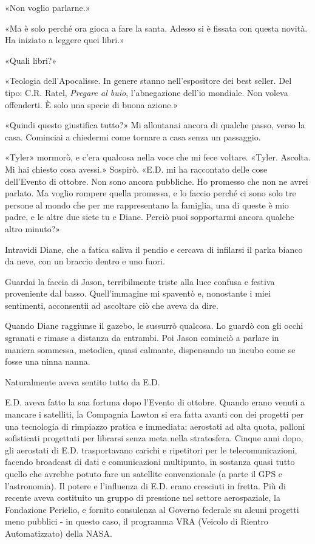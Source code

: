 «Non voglio parlarne.»

«Ma è solo perché ora gioca a fare la santa. Adesso si è fissata con
questa novità. Ha iniziato a leggere quei libri.»

«Quali libri?»

«Teologia dell'Apocalisse. In genere stanno nell'espositore dei best
seller. Del tipo: C.R. Ratel, \emph{Pregare al buio}, l'abnegazione
dell'io mondiale. Non voleva offenderti. È solo una specie di buona
azione.»

«Quindi questo giustifica tutto?» Mi allontanai ancora di qualche passo,
verso la casa. Cominciai a chiedermi come tornare a casa senza un
passaggio.

«Tyler» mormorò, e c'era qualcosa nella voce che mi fece voltare.
«Tyler. Ascolta. Mi hai chiesto cosa avessi.» Sospirò. «E.D. mi ha
raccontato delle cose dell'Evento di ottobre. Non sono ancora pubbliche.
Ho promesso che non ne avrei parlato. Ma voglio rompere quella promessa,
e lo faccio perché ci sono solo tre persone al mondo che per me
rappresentano la famiglia, una di queste è mio padre, e le altre due
siete tu e Diane. Perciò puoi sopportarmi ancora qualche altro minuto?»

Intravidi Diane, che a fatica saliva il pendio e cercava di infilarsi il
parka bianco da neve, con un braccio dentro e uno fuori.

Guardai la faccia di Jason, terribilmente triste alla luce confusa e
festiva proveniente dal basso. Quell'immagine mi spaventò e, nonostante
i miei sentimenti, acconsentii ad ascoltare ciò che aveva da dire.

\separatorefiori

Quando Diane raggiunse il gazebo, le sussurrò qualcosa. Lo guardò con
gli occhi sgranati e rimase a distanza da entrambi. Poi Jason cominciò a
parlare in maniera sommessa, metodica, quasi calmante, dispensando un
incubo come se fosse una ninna nanna.

Naturalmente aveva sentito tutto da E.D.

E.D. aveva fatto la sua fortuna dopo l'Evento di ottobre. Quando erano
venuti a mancare i satelliti, la Compagnia Lawton si era fatta avanti
con dei progetti per una tecnologia di rimpiazzo pratica e immediata:
aerostati ad alta quota, palloni sofisticati progettati per librarsi
senza meta nella stratosfera. Cinque anni dopo, gli aerostati di E.D.
trasportavano carichi e ripetitori per le telecomunicazioni, facendo
broadcast di dati e comunicazioni multipunto, in sostanza quasi tutto
quello che avrebbe potuto fare un satellite convenzionale (a parte il
GPS e l'astronomia). Il potere e l'influenza di E.D. erano cresciuti in
fretta. Più di recente aveva costituito un gruppo di pressione nel
settore aerospaziale, la Fondazione Perielio, e fornito consulenza al
Governo federale su alcuni progetti meno pubblici - in questo caso, il
programma VRA (Veicolo di Rientro Automatizzato) della NASA.

